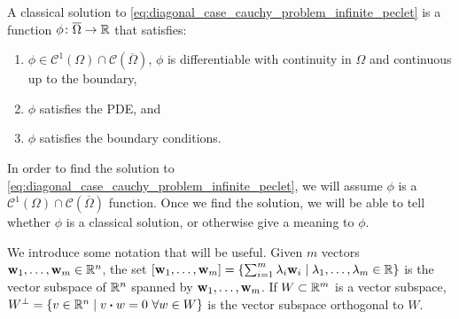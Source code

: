 \begin{definition}
	A classical solution to
	\eqref{eq:diagonal_case_cauchy_problem_infinite_peclet} is a function $\phi
	\colon \overline{\Omega} \rightarrow \mathbb{R}$ that satisfies:
	\begin{enumerate}[label={(\roman*)}, topsep=0pt]
		\item $\phi \in \mathcal{C}^1(\Omega) \cap
		\mathcal{C}(\overline{\Omega})$, \ie $\phi$ is differentiable with
		continuity in $\Omega$ and continuous up to the boundary,
		\item $\phi$ satisfies the PDE, and
		\item $\phi$ satisfies the boundary conditions.
	\end{enumerate}
\end{definition}
In order to find the solution to
\eqref{eq:diagonal_case_cauchy_problem_infinite_peclet}, we will assume $\phi$
is a $\mathcal{C}^1(\Omega) \cap \mathcal{C}(\overline{\Omega})$ function. Once
we find the solution, we will be able to tell whether $\phi$ is a classical
solution, or otherwise give a meaning to $\phi$.

We introduce some notation that will be useful. Given $m$ vectors $\vb{w}_1,
\ldots, \vb{w}_m \in \mathbb{R}^n$, the set $[\vb{w}_1, \ldots, \vb{w}_m] = \{
\sum_{i=1}^m \lambda_i \vb{w}_i \mid \lambda_1, \ldots, \lambda_m \in \mathbb{R} \}$
is the vector subspace of $\mathbb{R}^n$ spanned by $\vb{w}_1, \ldots, \vb{w}_m$. If
$W \subset \mathbb{R}^m$ is a vector subspace, $W^\perp = \{ v \in \real^n \mid v
\vdot w = 0 \ \forall w \in W \}$ is the vector subspace orthogonal to $W$.


